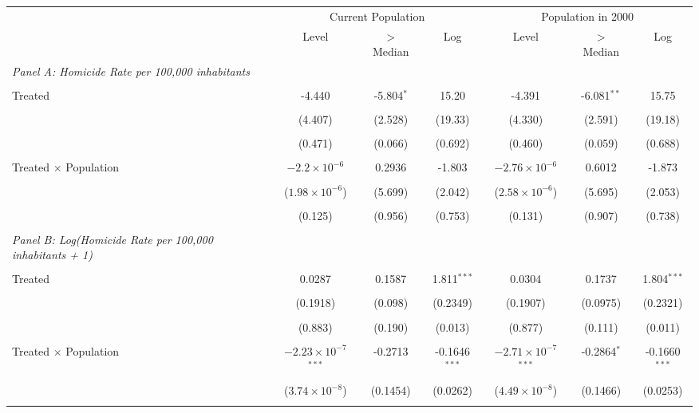 \documentclass[12pt]{article}
\begin{document}
\begin{table}[htbp]
   \centering
   \begin{adjustbox}{width=\textwidth,center}
   \begin{tabular}{lcccccc}
      \tabularnewline \midrule \midrule
      & \multicolumn{3}{c}{Current Population} & \multicolumn{3}{c}{Population in 2000} \\
      \cmidrule(lr){2-4} \cmidrule(lr){5-7}
      & Level & $>$ Median & Log & Level & $>$ Median & Log \\
      \midrule
      \emph{Panel A: Homicide Rate per 100,000 inhabitants} \\\\
      Treated & -4.440 & -5.804$^{*}$ & 15.20 & -4.391 & -6.081$^{**}$ & 15.75 \\\\
      & (4.407) & (2.528) & (19.33) & (4.330) & (2.591) & (19.18) \\\\
      & (0.471) & (0.066) & (0.692) & (0.460) & (0.059) & (0.688) \\\\
      Treated $\times$ Population & $-2.2\times 10^{-6}$ & 0.2936 & -1.803 & $-2.76\times 10^{-6}$ & 0.6012 & -1.873 \\\\
      & ($1.98\times 10^{-6}$) & (5.699) & (2.042) & ($2.58\times 10^{-6}$) & (5.695) & (2.053) \\\\
      & (0.125) & (0.956) & (0.753) & (0.131) & (0.907) & (0.738) \\\\
      \midrule
      \emph{Panel B: Log(Homicide Rate per 100,000 inhabitants + 1)} \\\\
      Treated & 0.0287 & 0.1587 & 1.811$^{***}$ & 0.0304 & 0.1737 & 1.804$^{***}$ \\\\
      & (0.1918) & (0.098) & (0.2349) & (0.1907) & (0.0975) & (0.2321) \\\\
      & (0.883) & (0.190) & (0.013) & (0.877) & (0.111) & (0.011) \\\\
      Treated $\times$ Population & $-2.23\times 10^{-7}$$^{***}$ & -0.2713 & -0.1646$^{***}$ & $-2.71\times 10^{-7}$$^{***}$ & -0.2864$^{*}$ & -0.1660$^{***}$ \\\\
      & ($3.74\times 10^{-8}$) & (0.1454) & (0.0262) & ($4.49\times 10^{-8}$) & (0.1466) & (0.0253) \\\\

\end{tabular}
\end{adjustbox}
\end{table}
\end{document}
